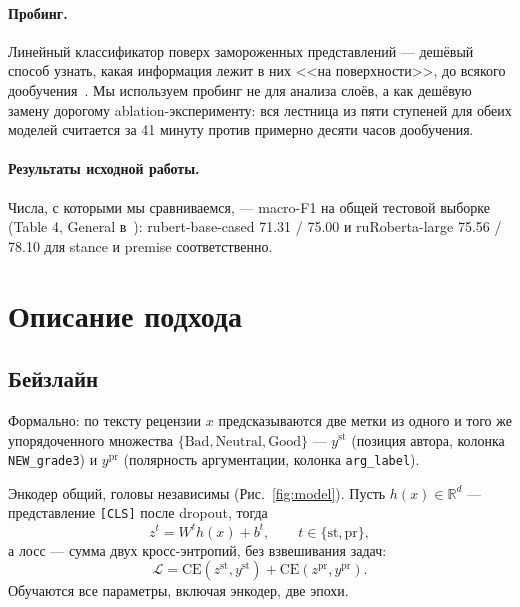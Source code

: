 \documentclass{article}
\begin{document}
\paragraph{Пробинг.} Линейный классификатор поверх замороженных представлений --- дешёвый
способ узнать, какая информация лежит в них <<на поверхности>>, до всякого
дообучения~\cite{alain2016understanding,tenney2019bert}. Мы используем пробинг не для
анализа слоёв, а как дешёвую замену дорогому ablation-эксперименту: вся лестница из пяти
ступеней для обеих моделей считается за 41 минуту против примерно десяти часов дообучения.

\paragraph{Результаты исходной работы.} Числа, с которыми мы сравниваемся, ---
macro-F1 на общей тестовой выборке (Table 4, General в~\cite{serbina2026argument}):
rubert-base-cased 71.31 / 75.00 и ruRoberta-large 75.56 / 78.10 для stance и premise
соответственно.

\section{Описание подхода}

\subsection{Бейзлайн}

Формально: по тексту рецензии $x$ предсказываются две метки из одного и того же
упорядоченного множества $\{\text{Bad}, \text{Neutral}, \text{Good}\}$ ---
$y^{\text{st}}$ (позиция автора, колонка \texttt{NEW\_grade3}) и $y^{\text{pr}}$
(полярность аргументации, колонка \texttt{arg\_label}).

Энкодер общий, головы независимы (Рис.~\ref{fig:model}). Пусть $h(x) \in \mathbb{R}^d$ ---
представление \texttt{[CLS]} после dropout, тогда
$$z^{t} = W^{t} h(x) + b^{t}, \qquad t \in \{\text{st}, \text{pr}\},$$
а лосс --- сумма двух кросс-энтропий, без взвешивания задач:
$$\mathcal{L} = \mathrm{CE}(z^{\text{st}}, y^{\text{st}}) + \mathrm{CE}(z^{\text{pr}}, y^{\text{pr}}).$$
Обучаются все параметры, включая энкодер, две эпохи.
\end{document}
